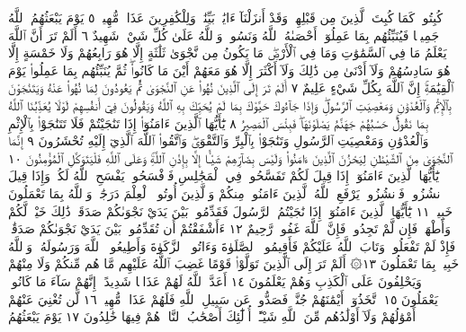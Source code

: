 كُبِتُوا۟ كَمَا كُبِتَ ٱلَّذِينَ مِن قَبْلِهِمْۚ وَقَدْ أَنزَلْنَآ ءَايَٰتِۭ بَيِّنَٰتࣲۚ
وَلِلْكَٰفِرِينَ عَذَابࣱ مُّهِينࣱ ٥ يَوْمَ يَبْعَثُهُمُ ٱللَّهُ جَمِيعࣰا فَيُنَبِّئُهُم
بِمَا عَمِلُوٓا۟ۚ أَحْصَىٰهُ ٱللَّهُ وَنَسُوهُۚ وَٱللَّهُ عَلَىٰ كُلِّ شَيْءࣲ شَهِيدٌ ٦
أَلَمْ تَرَ أَنَّ ٱللَّهَ يَعْلَمُ مَا فِي ٱلسَّمَٰوَٰتِ وَمَا فِي ٱلْأَرْضِۖ مَا يَكُونُ مِن
نَّجْوَىٰ ثَلَٰثَةٍ إِلَّا هُوَ رَابِعُهُمْ وَلَا خَمْسَةٍ إِلَّا هُوَ سَادِسُهُمْ وَلَآ أَدْنَىٰ
مِن ذَٰلِكَ وَلَآ أَكْثَرَ إِلَّا هُوَ مَعَهُمْ أَيْنَ مَا كَانُوا۟ۖ ثُمَّ يُنَبِّئُهُم بِمَا
عَمِلُوا۟ يَوْمَ ٱلْقِيَٰمَةِۚ إِنَّ ٱللَّهَ بِكُلِّ شَيْءٍ عَلِيمٌ ٧ أَلَمْ تَرَ إِلَى ٱلَّذِينَ
نُهُوا۟ عَنِ ٱلنَّجْوَىٰ ثُمَّ يَعُودُونَ لِمَا نُهُوا۟ عَنْهُ وَيَتَنَٰجَوْنَ بِٱلْإِثْمِ
وَٱلْعُدْوَٰنِ وَمَعْصِيَتِ ٱلرَّسُولِۖ وَإِذَا جَآءُوكَ حَيَّوْكَ بِمَا لَمْ يُحَيِّكَ
بِهِ ٱللَّهُ وَيَقُولُونَ فِيٓ أَنفُسِهِمْ لَوْلَا يُعَذِّبُنَا ٱللَّهُ بِمَا نَقُولُۚ حَسْبُهُمْ
جَهَنَّمُ يَصْلَوْنَهَاۖ فَبِئْسَ ٱلْمَصِيرُ ٨ يَٰٓأَيُّهَا ٱلَّذِينَ ءَامَنُوٓا۟ إِذَا
تَنَٰجَيْتُمْ فَلَا تَتَنَٰجَوْا۟ بِٱلْإِثْمِ وَٱلْعُدْوَٰنِ وَمَعْصِيَتِ ٱلرَّسُولِ
وَتَنَٰجَوْا۟ بِٱلْبِرِّ وَٱلتَّقْوَىٰۖ وَٱتَّقُوا۟ ٱللَّهَ ٱلَّذِيٓ إِلَيْهِ تُحْشَرُونَ ٩ إِنَّمَا
ٱلنَّجْوَىٰ مِنَ ٱلشَّيْطَٰنِ لِيَحْزُنَ ٱلَّذِينَ ءَامَنُوا۟ وَلَيْسَ بِضَآرِّهِمْ
شَيْـًٔا إِلَّا بِإِذْنِ ٱللَّهِۚ وَعَلَى ٱللَّهِ فَلْيَتَوَكَّلِ ٱلْمُؤْمِنُونَ ١٠ يَٰٓأَيُّهَا
ٱلَّذِينَ ءَامَنُوٓا۟ إِذَا قِيلَ لَكُمْ تَفَسَّحُوا۟ فِي ٱلْمَجَٰلِسِ فَٱفْسَحُوا۟ يَفْسَحِ
ٱللَّهُ لَكُمْۖ وَإِذَا قِيلَ ٱنشُزُوا۟ فَٱنشُزُوا۟ يَرْفَعِ ٱللَّهُ ٱلَّذِينَ ءَامَنُوا۟ مِنكُمْ
وَٱلَّذِينَ أُوتُوا۟ ٱلْعِلْمَ دَرَجَٰتࣲۚ وَٱللَّهُ بِمَا تَعْمَلُونَ خَبِيرࣱ ١١
يَٰٓأَيُّهَا ٱلَّذِينَ ءَامَنُوٓا۟ إِذَا نَٰجَيْتُمُ ٱلرَّسُولَ فَقَدِّمُوا۟ بَيْنَ يَدَيْ نَجْوَىٰكُمْ
صَدَقَةࣰۚ ذَٰلِكَ خَيْرࣱ لَّكُمْ وَأَطْهَرُۚ فَإِن لَّمْ تَجِدُوا۟ فَإِنَّ ٱللَّهَ غَفُورࣱ
رَّحِيمٌ ١٢ ءَأَشْفَقْتُمْ أَن تُقَدِّمُوا۟ بَيْنَ يَدَيْ نَجْوَىٰكُمْ صَدَقَٰتࣲۚ فَإِذْ لَمْ
تَفْعَلُوا۟ وَتَابَ ٱللَّهُ عَلَيْكُمْ فَأَقِيمُوا۟ ٱلصَّلَوٰةَ وَءَاتُوا۟ ٱلزَّكَوٰةَ وَأَطِيعُوا۟ ٱللَّهَ
وَرَسُولَهُۥۚ وَٱللَّهُ خَبِيرُۢ بِمَا تَعْمَلُونَ ١٣۞ أَلَمْ تَرَ إِلَى ٱلَّذِينَ تَوَلَّوْا۟
قَوْمًا غَضِبَ ٱللَّهُ عَلَيْهِم مَّا هُم مِّنكُمْ وَلَا مِنْهُمْ وَيَحْلِفُونَ عَلَى ٱلْكَذِبِ
وَهُمْ يَعْلَمُونَ ١٤ أَعَدَّ ٱللَّهُ لَهُمْ عَذَابࣰا شَدِيدًاۖ إِنَّهُمْ سَآءَ مَا كَانُوا۟
يَعْمَلُونَ ١٥ ٱتَّخَذُوٓا۟ أَيْمَٰنَهُمْ جُنَّةࣰ فَصَدُّوا۟ عَن سَبِيلِ ٱللَّهِ فَلَهُمْ
عَذَابࣱ مُّهِينࣱ ١٦ لَّن تُغْنِيَ عَنْهُمْ أَمْوَٰلُهُمْ وَلَآ أَوْلَٰدُهُم مِّنَ ٱللَّهِ
شَيْـًٔاۚ أُو۟لَٰٓئِكَ أَصْحَٰبُ ٱلنَّارِۖ هُمْ فِيهَا خَٰلِدُونَ ١٧ يَوْمَ يَبْعَثُهُمُ
